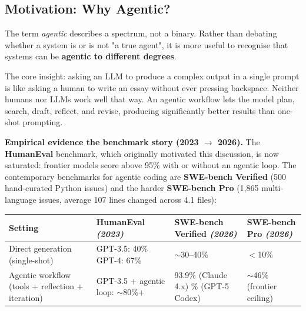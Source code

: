 \documentclass[a4paper,11pt]{article}
\begin{document}
\subsection{Motivation: Why Agentic?}

The term \textit{agentic} describes a spectrum, not a binary. Rather
than debating whether a system is or is not "a true agent", it is
more useful to recognise that systems can be \textbf{agentic to
different degrees}.

The core insight: asking an LLM to produce a complex output in a
single prompt is like asking a human to write an essay without ever
pressing backspace. Neither humans nor LLMs work well that way. An
agentic workflow lets the model plan, search, draft, reflect, and
revise, producing significantly better results than one-shot
prompting.

\textbf{Empirical evidence \textemdash{} the benchmark story (2023 $\to$ 2026).}
The \textbf{HumanEval} benchmark, which originally motivated this
discussion, is now saturated: frontier models score above 95\% with
or without an agentic loop. The contemporary benchmarks for agentic
coding are \textbf{SWE-bench Verified} (500 hand-curated Python
issues) and the harder \textbf{SWE-bench Pro} (1{,}865 multi-language
issues, average 107 lines changed across 4.1 files):

\begin{center}\footnotesize
\begin{tabular}{@{}p{3.4cm} p{3.5cm} p{3.5cm} p{3.4cm}@{}}
  \toprule
  \textbf{Setting} &
  \textbf{HumanEval} \newline\textit{\small(2023)} &
  \textbf{SWE-bench Verified} \newline\textit{\small(2026)} &
  \textbf{SWE-bench Pro} \newline\textit{\small(2026)} \\
  \midrule
  Direct generation \newline (single-shot) &
    GPT-3.5: 40\% \newline GPT-4: 67\% &
    $\sim$30–40\% &
    $<$10\% \\[0.4em]
  Agentic workflow \newline (tools + reflection + iteration) &
    GPT-3.5 + agentic loop: $\sim$80\%+ &
    93.9\% (Claude 4.x) \newline 85\% (GPT-5 Codex) &
    $\sim$46\% (frontier ceiling) \\
  \bottomrule
\end{tabular}
\end{center}
\end{document}
